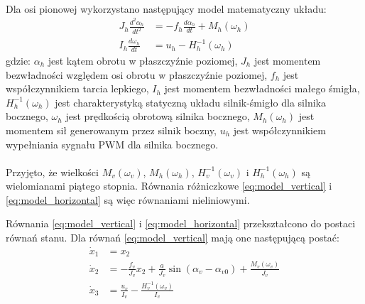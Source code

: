 \documentclass[11pt,a4paper]{article}
\begin{document}
\paragraph*{}
Dla osi pionowej wykorzystano następujący model matematyczny układu:
\begin{equation}
\begin{aligned}
J_h \frac{d^2\alpha_h}{dt^2} &= -f_h\frac{d\alpha_h}{dt}+M_h(\omega_h)\\
I_h\frac{d\omega_h}{dt} &= u_h - H_h^{-1}(\omega_h)
\end{aligned}
\label{eq:model_horizontal}
\end{equation}
\noindent gdzie:\newline
\(\alpha_h\) jest kątem obrotu w płaszczyźnie poziomej,\newline
\(J_h\) jest momentem bezwładności względem osi obrotu w płaszczyźnie poziomej,\newline
\(f_h\) jest współczynnikiem tarcia lepkiego,\newline
\(I_h\) jest momentem bezwładności małego śmigła,\newline
\(H_h^{-1}(\omega_h)\) jest charakterystyką statyczną układu silnik-śmigło dla silnika bocznego,\newline
\(\omega_h\) jest prędkością obrotową silnika bocznego,\newline
\(M_h(\omega_h)\) jest momentem sił generowanym przez silnik boczny,\newline
\(u_h\) jest współczynnikiem wypełniania sygnału PWM dla silnika bocznego.
\paragraph*{}
Przyjęto, że wielkości \(M_v(\omega_v)\), \(M_h(\omega_h)\), \(H_v^{-1}(\omega_v)\) i \(H_h^{-1}(\omega_h)\) są wielomianami piątego stopnia. Równania różniczkowe \eqref{eq:model_vertical} i \eqref{eq:model_horizontal} są więc równaniami nieliniowymi.

Równania \eqref{eq:model_vertical} i \eqref{eq:model_horizontal} przekształcono do postaci równań stanu. Dla równań \eqref{eq:model_vertical} mają one następującą postać:
\begin{equation}
\begin{aligned}
\dot x_1 &= x_2\\
\dot x_2 &= -\frac{f_v}{J_v}x_2+\frac{a}{J_v}\sin (\alpha_v-\alpha_{v0})+\frac{M_v(\omega_v)}{J_v}\\
\dot x_3 &= \frac{u_v}{I_v}-\frac{H_v^{-1}(\omega_v)}{I_v}
\end{aligned}
\label{eq:ss_vertical}
\end{equation}
\end{document}

